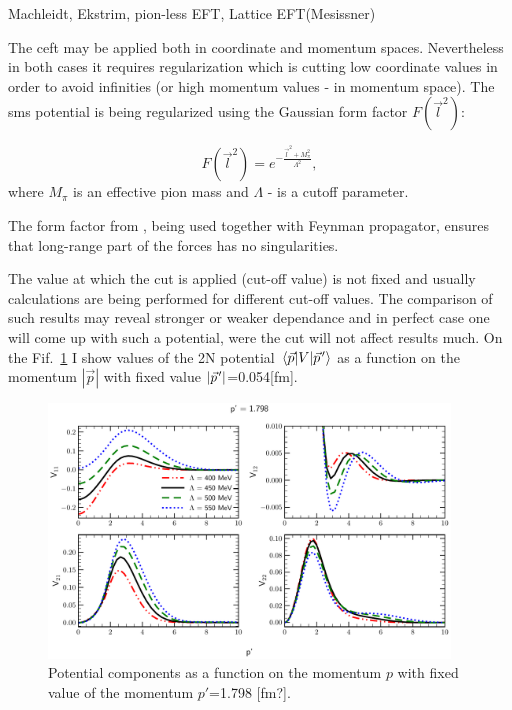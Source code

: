 {\color{red} Machleidt, Ekstrim, pion-less EFT, Lattice EFT(Mesissner)}


The \gls*{ceft} may be applied both in coordinate and momentum spaces.
Nevertheless in both cases it requires regularization which is cutting 
low coordinate values in order to avoid infinities 
(or high momentum values - in momentum space). 
The \gls*{sms} potential is being regularized using the Gaussian form factor
$F(\vec{l}^2)$:

\begin{equation}
    F(\vec{l}^2) = e^{-\frac{\vec{l}^2 + M_\pi^2}{\Lambda^2}},
    \label{regulator}
\end{equation}
where $M_\pi$ is an effective pion mass and $\Lambda$ - is a cutoff parameter.

The form factor from , being used together with Feynman propagator,
ensures that long-range part of the forces has no singularities. 

The value at which
the cut is applied (cut-off value) is not fixed and usually calculations
are being performed for different cut-off values. The comparison
of such results may reveal stronger or weaker dependance and in perfect
case one will come up with such a potential, were the cut will
not affect results much. On the Fif.~\ref{potential_cutoff} 
I show values of the 2N potential $\matrixel{\vec{p}}{V}{\pvec{p}}$
as a function on the momentum $|\vec{p}|$ with fixed value $|\pvec{p}|$=0.054[fm].



\begin{figure}[htb]
    \begin{center}
    \includegraphics[width=0.95\textwidth]{PlotData/Deuteron/WAVEFUNC/potential_pp1.798.pdf}
    \end{center}
    \caption{Potential components as a function on the momentum $p$ with fixed
    value of the momentum $p'$=1.798 [fm?].
    }
    \label{potential_cutoff}
\end{figure}



